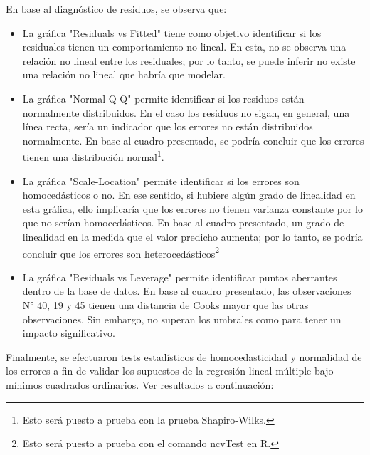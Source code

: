 \documentclass[a4paper,10pt]{article}\usepackage[]{graphicx}\usepackage[]{color}
\begin{document}
En base al diagnóstico de residuos, se observa que:
\begin{itemize}
  \item La gráfica "Residuals vs Fitted" tiene como objetivo identificar si los residuales tienen un comportamiento no lineal. En esta, no se observa una relación no lineal entre los residuales; por lo tanto, se puede inferir no existe una relación no lineal que habría que modelar.
  \item La gráfica "Normal Q-Q" permite identificar si los residuos están normalmente distribuidos. En el caso los residuos no sigan, en general, una línea recta, sería un indicador que los errores no están distribuidos normalmente. En base al cuadro presentado, se podría concluir que los errores tienen una distribución normal\footnote{Esto será puesto a prueba con la prueba Shapiro-Wilks.}.
  \item La gráfica "Scale-Location" permite identificar si los errores son homocedásticos o no. En ese sentido, si hubiere algún grado de linealidad en esta gráfica, ello implicaría que los errores no tienen varianza constante por lo que no serían homocedásticos. En base al cuadro presentado, un grado de linealidad en la medida que el valor predicho aumenta; por lo tanto, se podría concluir que los errores son heterocedásticos\footnote{Esto será puesto a prueba con el comando ncvTest en R.}
  \item La gráfica "Residuals vs Leverage" permite identificar puntos aberrantes dentro de la base de datos. En base al cuadro presentado, las observaciones N° 40, 19 y 45 tienen una distancia de Cooks mayor que las otras observaciones. Sin embargo, no superan los umbrales como para tener un impacto significativo.
\end{itemize}

Finalmente, se efectuaron tests estadísticos de homocedasticidad y normalidad de los errores a fin de validar los supuestos de la regresión lineal múltiple bajo mínimos cuadrados ordinarios. Ver resultados a continuación:
\end{document}
